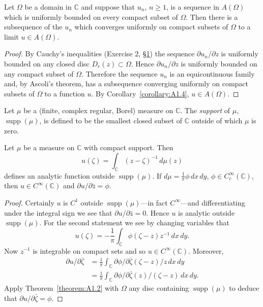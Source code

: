  Let $\Omega$ be a domain in $\mathbb C$ and suppose that $u_n$, $n\geq1$, is a sequence in $A(\Omega)$ which is uniformly bounded on every compact subset of $\Omega$. Then there is a subsequence of the $u_n$ which converges uniformly on compact subsets of $\Omega$ to a limit $u\in A(\Omega)$.
\begin{proof} By Cauchy's inequalities (Exercise 2, \hyperref[sec:1:1]{\S1}) the sequence $\partial u_n/\partial z$ is uniformly bounded on any closed disc $D_r(z)\subset\Omega$. Hence $\partial u_n/\partial z$ is uniformly bounded on any compact subset of $\Omega$. Therefore the sequence $u_n$ is an equicontinuous family and, by Ascoli's theorem, has a subsequence converging uniformly on compact subsets of $\Omega$ to a function $u$. By Corollary~\ref{corollary:A1.4}, $u\in A(\Omega)$. \end{proof}

Let $\mu$ be a (finite, complex regular, Borel) measure on $\mathbb C$. The \emph{support} of $\mu$, $\operatorname{supp}(\mu)$, is defined to be the smallest closed subset of $\mathbb C$ outside of which $\mu$ is zero.

 Let $\mu$ be a measure on $\mathbb C$ with compact support. Then
\[ u(\zeta)=\int_{\mathbb C}(z-\zeta)^{-1}\,d\mu(z) \]
defines an analytic function outside $\operatorname{supp}(\mu)$. If $d\mu=\frac1\pi\phi\,dx\,dy$, $\phi\in C_c^\infty(\mathbb C)$, then $u\in C^\infty(\mathbb C)$ and $\partial u/\partial\bar z=\phi$.
\begin{proof}
Certainly $u$ is $C^1$ outside $\operatorname{supp}(\mu)$---in fact $C^\infty$---and differentiating under the integral sign we see that $\partial u/\partial\bar z=0$. Hence $u$ is analytic outside $\operatorname{supp}(\mu)$. For the second statement we see by changing variables that
\[ u(\zeta)=-\frac1\pi\int_{\mathbb C}\phi(\zeta-z)z^{-1}\,dx\,dy. \]
Now $z^{-1}$ is integrable on compact sets and so $u\in C^\infty(\mathbb C)$. Moreover,
\begin{align*}
\partial u/\partial\bar\zeta&=\frac1\pi\int_{\mathbb C}\partial\phi/\partial\bar\zeta(\zeta-z)/z\,dx\,dy\\
&=\frac1\pi\int_{\mathbb C}\partial\phi/\partial\bar\zeta(z)/(\zeta-z)\,dx\,dy.
\end{align*}
Apply Theorem~\ref{theorem:A1.2} with $\Omega$ any disc containing $\operatorname{supp}(\mu)$ to deduce that $\partial u/\partial\bar\zeta=\phi$.
\end{proof}
